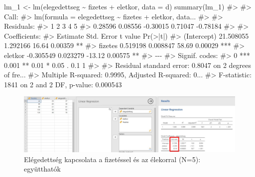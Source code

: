 \documentclass[
  letterpaper,
]{krantz}
\makeatletter
\newenvironment{Shaded}{\begin{snugshade}}{\end{snugshade}}
\newcommand{\AttributeTok}[1]{\textcolor[rgb]{0.40,0.45,0.13}{#1}}
\newcommand{\CommentTok}[1]{\textcolor[rgb]{0.37,0.37,0.37}{#1}}
\newcommand{\FunctionTok}[1]{\textcolor[rgb]{0.28,0.35,0.67}{#1}}
\newcommand{\NormalTok}[1]{\textcolor[rgb]{0.00,0.23,0.31}{#1}}
\newcommand{\OtherTok}[1]{\textcolor[rgb]{0.00,0.23,0.31}{#1}}
\newcommand{\SpecialCharTok}[1]{\textcolor[rgb]{0.37,0.37,0.37}{#1}}
\newenvironment{kframe}{%
\medskip{}
\setlength{\fboxsep}{.8em}
 \def\at@end@of@kframe{}%
 \ifinner\ifhmode%
  \def\at@end@of@kframe{\end{minipage}}%
  \begin{minipage}{\columnwidth}%
 \fi\fi%
 \def\FrameCommand##1{\hskip\@totalleftmargin \hskip-\fboxsep
 \colorbox{shadecolor}{##1}\hskip-\fboxsep
     \hskip-\linewidth \hskip-\@totalleftmargin \hskip\columnwidth}%
 \MakeFramed {\advance\hsize-\width
   \@totalleftmargin\z@ \linewidth\hsize
   \@setminipage}}%
 {\par\unskip\endMakeFramed%
 \at@end@of@kframe}
\renewenvironment{Shaded}{\begin{kframe}}{\end{kframe}}
\makeatother
\begin{document}
\begin{Shaded}
\begin{Highlighting}[]
\NormalTok{lm\_1 }\OtherTok{\textless{}{-}} \FunctionTok{lm}\NormalTok{(elegedettseg }\SpecialCharTok{\textasciitilde{}}\NormalTok{ fizetes }\SpecialCharTok{+}\NormalTok{ eletkor, }\AttributeTok{data =}\NormalTok{ d)}
\FunctionTok{summary}\NormalTok{(lm\_1)}
\CommentTok{\#\textgreater{} }
\CommentTok{\#\textgreater{} Call:}
\CommentTok{\#\textgreater{} lm(formula = elegedettseg \textasciitilde{} fizetes + eletkor, data...}
\CommentTok{\#\textgreater{} }
\CommentTok{\#\textgreater{} Residuals:}
\CommentTok{\#\textgreater{}        1        2        3        4        5 }
\CommentTok{\#\textgreater{}  0.28596  0.08556 {-}0.30015  0.71047 {-}0.78184 }
\CommentTok{\#\textgreater{} }
\CommentTok{\#\textgreater{} Coefficients:}
\CommentTok{\#\textgreater{}              Estimate Std. Error t value Pr(\textgreater{}|t|)    }
\CommentTok{\#\textgreater{} (Intercept) 21.508055   1.292166   16.64  0.00359 ** }
\CommentTok{\#\textgreater{} fizetes      0.519198   0.008847   58.69  0.00029 ***}
\CommentTok{\#\textgreater{} eletkor     {-}0.305549   0.023279  {-}13.12  0.00575 ** }
\CommentTok{\#\textgreater{} {-}{-}{-}}
\CommentTok{\#\textgreater{} Signif. codes:  }
\CommentTok{\#\textgreater{} 0 \textquotesingle{}***\textquotesingle{} 0.001 \textquotesingle{}**\textquotesingle{} 0.01 \textquotesingle{}*\textquotesingle{} 0.05 \textquotesingle{}.\textquotesingle{} 0.1 \textquotesingle{} \textquotesingle{} 1}
\CommentTok{\#\textgreater{} }
\CommentTok{\#\textgreater{} Residual standard error: 0.8047 on 2 degrees of fre...}
\CommentTok{\#\textgreater{} Multiple R{-}squared:  0.9995, Adjusted R{-}squared:  0...}
\CommentTok{\#\textgreater{} F{-}statistic:  1841 on 2 and 2 DF,  p{-}value: 0.000543}
\end{Highlighting}
\end{Shaded}

\begin{figure}

{\centering \includegraphics{./images/lin_reg_fizetes_eletkor_elegedettseg_01_kep_01.jpg}

}

\caption{Elégedettség kapcsolata a fizetéssel és az élekorral (N=5):
együtthatók}

\end{figure}
\end{document}
